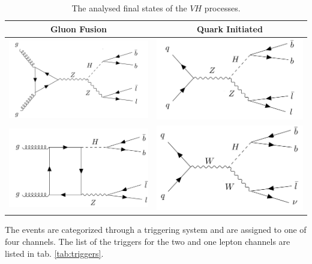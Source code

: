 \begin{table}[h!]
	\centering
	\begin{tabular}{c|c}
		Gluon Fusion & Quark Initiated \\
		\hline
		\includegraphics[width=0.4\linewidth]{figures/analysis/ggZH_triangle_bbll}&\includegraphics[width=0.4\linewidth]{figures/analysis/ZH_DY_bbll}  \\
		\includegraphics[width=0.4\linewidth]{figures/analysis/ggZH_box_bbll}& \includegraphics[width=0.4\linewidth]{figures/analysis/HWbbl} \\
	\end{tabular}
	\caption{The analysed final states of the $VH$ processes.}
	\label{fig:VH_finalstates}
\end{table}

The events are categorized through a triggering system and are assigned to one of four channels. The list of the triggers for the two and one lepton channels are listed in tab. \ref{tab:triggers}.

